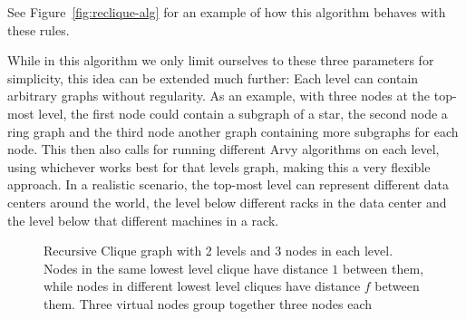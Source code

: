 \documentclass[a4paper, oneside]{discothesis}
\begin{document}
See Figure~\ref{fig:reclique-alg} for an example of how this algorithm behaves with these rules.

While in this algorithm we only limit ourselves to these three parameters for simplicity, this idea can be extended much further: Each level can contain arbitrary graphs without regularity. As an example, with three nodes at the top-most level, the first node could contain a subgraph of a star, the second node a ring graph and the third node another graph containing more subgraphs for each node. This then also calls for running different Arvy algorithms on each level, using whichever works best for that levels graph, making this a very flexible approach. In a realistic scenario, the top-most level can represent different data centers around the world, the level below different racks in the data center and the level below that different machines in a rack.

\begin{figure}
\centering
{}
\caption{Recursive Clique graph with 2 levels and 3 nodes in each level. Nodes in the same lowest level clique have distance $1$ between them, while nodes in different lowest level cliques have distance $f$ between them. Three virtual nodes group together three nodes each}
\label{fig:reclique}
\end{figure}
\end{document}
